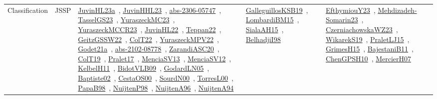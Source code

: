 {\begin{longtable}{lp{3cm}>{\raggedright\arraybackslash}p{6cm}>{\raggedright\arraybackslash}p{6cm}>{\raggedright\arraybackslash}p{8cm}}
Classification & JSSP & \href{../works/JuvinHL23a.pdf}{JuvinHL23a}~\cite{JuvinHL23a}, \href{../works/JuvinHHL23.pdf}{JuvinHHL23}~\cite{JuvinHHL23}, \href{../works/abs-2306-05747.pdf}{abs-2306-05747}~\cite{abs-2306-05747}, \href{../works/TasselGS23.pdf}{TasselGS23}~\cite{TasselGS23}, \href{../works/YuraszeckMC23.pdf}{YuraszeckMC23}~\cite{YuraszeckMC23}, \href{../works/YuraszeckMCCR23.pdf}{YuraszeckMCCR23}~\cite{YuraszeckMCCR23}, \href{../works/JuvinHL22.pdf}{JuvinHL22}~\cite{JuvinHL22}, \href{../works/Teppan22.pdf}{Teppan22}~\cite{Teppan22}, \href{../works/GeitzGSSW22.pdf}{GeitzGSSW22}~\cite{GeitzGSSW22}, \href{../works/ColT22.pdf}{ColT22}~\cite{ColT22}, \href{../works/YuraszeckMPV22.pdf}{YuraszeckMPV22}~\cite{YuraszeckMPV22}, \href{../works/Godet21a.pdf}{Godet21a}~\cite{Godet21a}, \href{../works/abs-2102-08778.pdf}{abs-2102-08778}~\cite{abs-2102-08778}, \href{../works/ZarandiASC20.pdf}{ZarandiASC20}~\cite{ZarandiASC20}, \href{../works/ColT19.pdf}{ColT19}~\cite{ColT19}, \href{../works/Pralet17.pdf}{Pralet17}~\cite{Pralet17}, \href{../works/MenciaSV13.pdf}{MenciaSV13}~\cite{MenciaSV13}, \href{../works/MenciaSV12.pdf}{MenciaSV12}~\cite{MenciaSV12}, \href{../works/KelbelH11.pdf}{KelbelH11}~\cite{KelbelH11}, \href{../works/BidotVLB09.pdf}{BidotVLB09}~\cite{BidotVLB09}, \href{../works/GodardLN05.pdf}{GodardLN05}~\cite{GodardLN05}, \href{../works/Baptiste02.pdf}{Baptiste02}~\cite{Baptiste02}, \href{../works/CestaOS00.pdf}{CestaOS00}~\cite{CestaOS00}, \href{../works/SourdN00.pdf}{SourdN00}~\cite{SourdN00}, \href{../works/TorresL00.pdf}{TorresL00}~\cite{TorresL00}, \href{../works/PapaB98.pdf}{PapaB98}~\cite{PapaB98}, \href{../works/NuijtenP98.pdf}{NuijtenP98}~\cite{NuijtenP98}, \href{../works/NuijtenA96.pdf}{NuijtenA96}~\cite{NuijtenA96}, \href{../works/NuijtenA94.pdf}{NuijtenA94}~\cite{NuijtenA94} & \href{../works/GalleguillosKSB19.pdf}{GalleguillosKSB19}~\cite{GalleguillosKSB19}, \href{../works/LombardiBM15.pdf}{LombardiBM15}~\cite{LombardiBM15}, \href{../works/SialaAH15.pdf}{SialaAH15}~\cite{SialaAH15}, \href{../works/BelhadjiI98.pdf}{BelhadjiI98}~\cite{BelhadjiI98} & \href{../works/EfthymiouY23.pdf}{EfthymiouY23}~\cite{EfthymiouY23}, \href{../works/Mehdizadeh-Somarin23.pdf}{Mehdizadeh-Somarin23}~\cite{Mehdizadeh-Somarin23}, \href{../works/CzerniachowskaWZ23.pdf}{CzerniachowskaWZ23}~\cite{CzerniachowskaWZ23}, \href{../works/WikarekS19.pdf}{WikarekS19}~\cite{WikarekS19}, \href{../works/PraletLJ15.pdf}{PraletLJ15}~\cite{PraletLJ15}, \href{../works/GrimesH15.pdf}{GrimesH15}~\cite{GrimesH15}, \href{../works/BajestaniB11.pdf}{BajestaniB11}~\cite{BajestaniB11}, \href{../works/ChenGPSH10.pdf}{ChenGPSH10}~\cite{ChenGPSH10}, \href{../works/MercierH07.pdf}{MercierH07}~\cite{MercierH07}\\

\end{longtable}}
